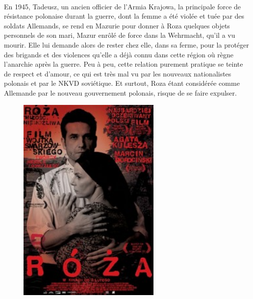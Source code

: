 \documentclass[12pt, twocolumn]{amsart}
\begin{document}
\paragraph{}
En 1945, Tadeusz, un ancien officier de l'Armia Krajowa, la principale force de résistance polonaise durant la guerre, dont la femme a été violée et tuée par des soldats Allemands, se rend en Mazurie pour donner à Roza quelques objets personnels de son mari, Mazur enrôlé de force dans la Wehrmacht, qu'il a vu mourir. Elle lui demande alors de rester chez elle, dans sa ferme, pour la protéger des brigands et des violences qu'elle a déjà connu dans cette région où règne l'anarchie après la guerre. Peu à peu, cette relation purement pratique se teinte de respect et d'amour, ce qui est très mal vu par les nouveaux nationalistes polonais et par le NKVD soviétique. Et surtout, Roza étant considérée comme Allemande par le nouveau gouvernement polonais, risque de se faire expulser. \\
\begin{figure}

\includegraphics[width=7cm]{roza.jpg}

\end{figure}
\clearpage
\end{document}
